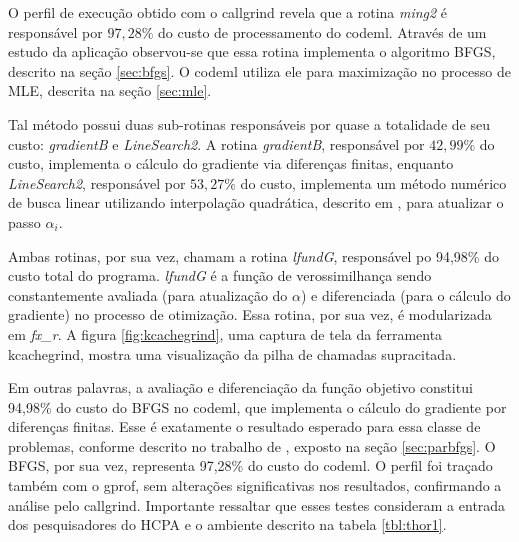\documentclass[cic,tc]{iiufrgs}
\begin{document}
O perfil de execução obtido com o callgrind revela que a rotina \textit{ming2}
é responsável por $97,28\%$ do custo de processamento do codeml. Através de um
estudo da aplicação observou-se que essa rotina implementa o algoritmo BFGS,
descrito na seção \ref{sec:bfgs}. O codeml utiliza ele para maximização no
processo de MLE, descrita na seção \ref{sec:mle}.

Tal método possui duas sub-rotinas responsáveis por quase a totalidade de seu
custo: \textit{gradientB} e \textit{LineSearch2}. A rotina \textit{gradientB},
responsável por $42,99\%$ do custo, implementa o cálculo do gradiente via
diferenças finitas, enquanto \textit{LineSearch2}, responsável por $53,27\%$ do
custo, implementa um método numérico de busca linear utilizando interpolação
quadrática, descrito em \cite{wolfe1978numerical}, para atualizar o passo
$\alpha_i$.

Ambas rotinas, por sua vez, chamam a rotina \textit{lfundG}, responsável po
94,98\% do custo total do programa. \textit{lfundG} é a função de
verossimilhança sendo constantemente avaliada (para atualização do $\alpha$) e
diferenciada (para o cálculo do gradiente) no processo de otimização. Essa
rotina, por sua vez, é modularizada em \textit{fx\_r}. A figura
\ref{fig:kcachegrind}, uma captura de tela da ferramenta kcachegrind, mostra
uma visualização da pilha de chamadas supracitada.

Em outras palavras, a avaliação e diferenciação da função objetivo constitui
94,98\% do custo do BFGS no codeml, que implementa o cálculo do gradiente por
diferenças finitas. Esse é exatamente o resultado esperado para essa classe de
problemas, conforme descrito no trabalho de \cite{byrd1988parallel}, exposto na
seção \ref{sec:parbfgs}. O BFGS, por sua vez, representa 97,28\% do custo do
codeml. O perfil foi traçado também com o gprof, sem alterações
significativas nos resultados, confirmando a análise pelo callgrind. Importante
ressaltar que esses testes consideram a entrada dos pesquisadores do HCPA e o
ambiente descrito na tabela \ref{tbl:thor1}.
\end{document}
